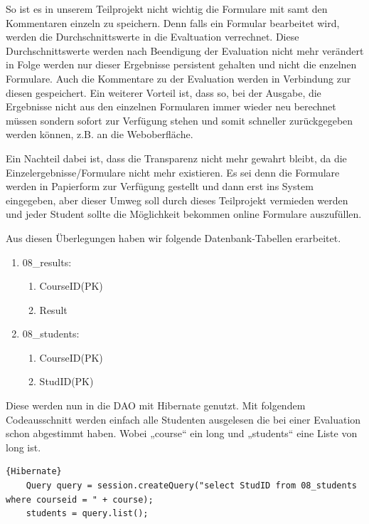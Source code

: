 \documentclass[titlepage, 12pt,a4paper]{scrartcl}
\begin{document}
So ist es in unserem Teilprojekt nicht wichtig die Formulare mit samt den
Kommentaren einzeln zu speichern. Denn falls ein Formular bearbeitet wird,
werden die Durchschnittswerte in die Evaltuation verrechnet. Diese
Durchschnittswerte werden nach Beendigung der Evaluation nicht mehr verändert in
Folge werden nur dieser Ergebnisse persistent gehalten und nicht die enzelnen
Formulare. Auch die Kommentare zu der Evaluation werden in Verbindung zur
diesen gespeichert. Ein weiterer Vorteil ist, dass so, bei der Ausgabe,
die Ergebnisse nicht aus den einzelnen Formularen immer wieder neu berechnet
müssen sondern sofort zur Verfügung stehen und somit schneller zurückgegeben
werden können, z.B. an die Weboberfläche.

Ein Nachteil dabei ist, dass die Transparenz nicht mehr gewahrt bleibt, da die
Einzelergebnisse/Formulare nicht mehr existieren. Es sei denn die Formulare
werden in Papierform zur Verfügung gestellt und dann erst ins System
eingegeben, aber dieser Umweg soll durch dieses Teilprojekt vermieden werden
und jeder Student sollte die Möglichkeit bekommen online Formulare auszufüllen.


Aus diesen Überlegungen haben wir folgende Datenbank-Tabellen erarbeitet.

\begin{enumerate}
\item 08\_results:
\begin{enumerate}
\item CourseID(PK)
\item Result 
\end{enumerate}

\item 08\_students:
\begin{enumerate}
\item CourseID(PK)
\item StudID(PK)
\end{enumerate}
\end{enumerate}


Diese werden nun in die DAO mit Hibernate genutzt. Mit folgendem Codeausschnitt werden einfach
alle Studenten ausgelesen die bei einer Evaluation schon abgestimmt haben. Wobei „course“ ein long
und „students“ eine Liste von long ist.
\begin{lstlisting}[caption=Hibernate]{Hibernate}
	Query query = session.createQuery("select StudID from 08_students where courseid = " + course);
	students = query.list();
\end{lstlisting}
\end{document}
